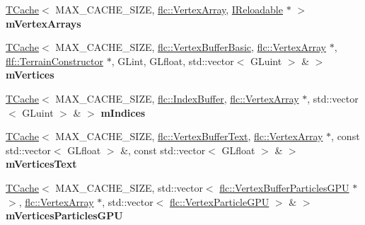 \begin{DoxyCompactItemize}
\item 
\hyperlink{classflw_1_1flf_1_1TCache}{T\+Cache}$<$ M\+A\+X\+\_\+\+C\+A\+C\+H\+E\+\_\+\+S\+I\+ZE, \hyperlink{classflw_1_1flc_1_1VertexArray}{flc\+::\+Vertex\+Array}, \hyperlink{classflw_1_1flf_1_1IReloadable}{I\+Reloadable} $\ast$ $>$ {\bfseries m\+Vertex\+Arrays}\hypertarget{structflw_1_1flf_1_1BufferSystem_a7974ca27bdeeb1606fb34d54a9f828fa}{}\label{structflw_1_1flf_1_1BufferSystem_a7974ca27bdeeb1606fb34d54a9f828fa}

\item 
\hyperlink{classflw_1_1flf_1_1TCache}{T\+Cache}$<$ M\+A\+X\+\_\+\+C\+A\+C\+H\+E\+\_\+\+S\+I\+ZE, \hyperlink{classflw_1_1flc_1_1VertexBufferBasic}{flc\+::\+Vertex\+Buffer\+Basic}, \hyperlink{classflw_1_1flc_1_1VertexArray}{flc\+::\+Vertex\+Array} $\ast$, \hyperlink{classflw_1_1flf_1_1TerrainConstructor}{flf\+::\+Terrain\+Constructor} $\ast$, G\+Lint, G\+Lfloat, std\+::vector$<$ G\+Luint $>$ \& $>$ {\bfseries m\+Vertices}\hypertarget{structflw_1_1flf_1_1BufferSystem_ada93731ae4c7155525f3d4961e329a54}{}\label{structflw_1_1flf_1_1BufferSystem_ada93731ae4c7155525f3d4961e329a54}

\item 
\hyperlink{classflw_1_1flf_1_1TCache}{T\+Cache}$<$ M\+A\+X\+\_\+\+C\+A\+C\+H\+E\+\_\+\+S\+I\+ZE, \hyperlink{classflw_1_1flc_1_1IndexBuffer}{flc\+::\+Index\+Buffer}, \hyperlink{classflw_1_1flc_1_1VertexArray}{flc\+::\+Vertex\+Array} $\ast$, std\+::vector$<$ G\+Luint $>$ \& $>$ {\bfseries m\+Indices}\hypertarget{structflw_1_1flf_1_1BufferSystem_a0e8fe9e2c159bedf179376db8406a12d}{}\label{structflw_1_1flf_1_1BufferSystem_a0e8fe9e2c159bedf179376db8406a12d}

\item 
\hyperlink{classflw_1_1flf_1_1TCache}{T\+Cache}$<$ M\+A\+X\+\_\+\+C\+A\+C\+H\+E\+\_\+\+S\+I\+ZE, \hyperlink{classflw_1_1flc_1_1VertexBufferText}{flc\+::\+Vertex\+Buffer\+Text}, \hyperlink{classflw_1_1flc_1_1VertexArray}{flc\+::\+Vertex\+Array} $\ast$, const std\+::vector$<$ G\+Lfloat $>$ \&, const std\+::vector$<$ G\+Lfloat $>$ \& $>$ {\bfseries m\+Vertices\+Text}\hypertarget{structflw_1_1flf_1_1BufferSystem_a9f8c063d64ae750b96f9fb2f64fed774}{}\label{structflw_1_1flf_1_1BufferSystem_a9f8c063d64ae750b96f9fb2f64fed774}

\item 
\hyperlink{classflw_1_1flf_1_1TCache}{T\+Cache}$<$ M\+A\+X\+\_\+\+C\+A\+C\+H\+E\+\_\+\+S\+I\+ZE, std\+::vector$<$ \hyperlink{classflw_1_1flc_1_1VertexBufferParticlesGPU}{flc\+::\+Vertex\+Buffer\+Particles\+G\+PU} $\ast$ $>$, \hyperlink{classflw_1_1flc_1_1VertexArray}{flc\+::\+Vertex\+Array} $\ast$, std\+::vector$<$ \hyperlink{structflw_1_1flc_1_1VertexParticleGPU}{flc\+::\+Vertex\+Particle\+G\+PU} $>$ \& $>$ {\bfseries m\+Vertices\+Particles\+G\+PU}\hypertarget{structflw_1_1flf_1_1BufferSystem_afd8dce391dc910999a16c4fdd53a79e3}{}\label{structflw_1_1flf_1_1BufferSystem_afd8dce391dc910999a16c4fdd53a79e3}


\end{DoxyCompactItemize}
